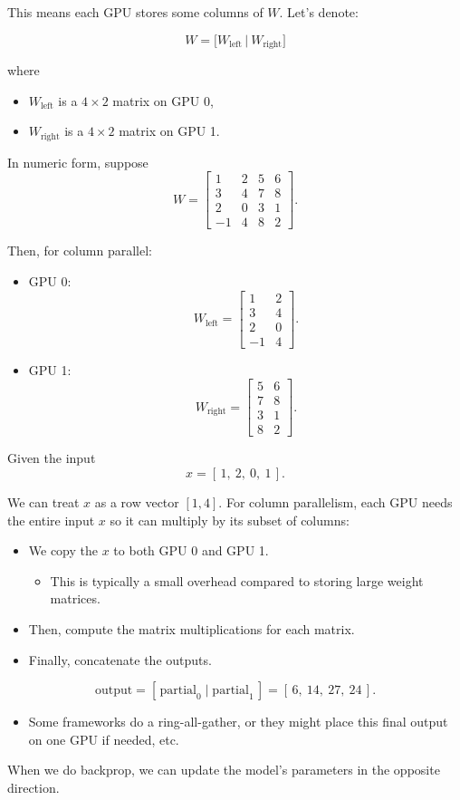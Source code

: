 This means each GPU stores some columns of \(W\). Let's denote:

\[
W = \bigl[W_{\text{left}} \,\big|\ W_{\text{right}}\bigr]
\]

where
\begin{itemize}
	\item \( W_{\text{left}} \) is a \(4 \times 2\) matrix on GPU 0,  
	\item \( W_{\text{right}} \) is a \(4 \times 2\) matrix on GPU 1.
\end{itemize}

In numeric form, suppose
\[
W =
\begin{bmatrix}
1 & 2 & 5 & 6\\
3 & 4 & 7 & 8\\
2 & 0 & 3 & 1\\
-1 & 4 & 8 & 2
\end{bmatrix}.
\]

Then, for column parallel:
\begin{itemize}
	\item GPU 0:  
  \[
  W_{\text{left}} = 
  \begin{bmatrix}
  1 & 2 \\
  3 & 4 \\
  2 & 0 \\
  -1 & 4 
  \end{bmatrix}.
  \]
\item GPU 1:  
  \[
  W_{\text{right}} = 
  \begin{bmatrix}
  5 & 6 \\
  7 & 8 \\
  3 & 1 \\
  8 & 2
  \end{bmatrix}.
  \]
\end{itemize}

Given the input
\[
x = [\, 1,\ 2,\ 0,\ 1\,].
\]

We can treat \(x\) as a row vector \([1,4]\). For column parallelism, each GPU needs the entire input \(x\) so it can multiply by its subset of columns:
\begin{itemize}
	\item We copy the \( x \) to both GPU 0 and GPU 1.  
		\begin{itemize}
			\item This is typically a small overhead compared to storing large weight matrices.
		\end{itemize}
	\item Then, compute the matrix multiplications for each matrix.
	\item Finally, concatenate the outputs.
\end{itemize}

\[
\text{output} = [\, \text{partial}_0 \;\big|\; \text{partial}_1\,] = [\,6,\ 14,\ 27,\ 24\,].
\]
\begin{itemize}
	\item Some frameworks do a ring-all-gather, or they might place this final output on one GPU if needed, etc. 
\end{itemize}

When we do backprop, we can update the model's parameters in the opposite direction. 

